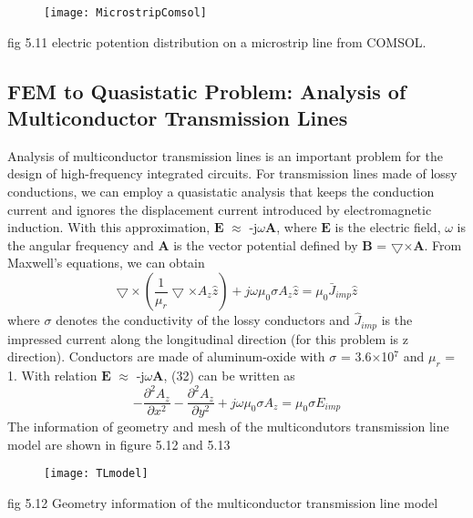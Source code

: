 \documentclass[journal]{IEEEtran}
\begin{document}
\begin{figure}[h]
	\centering
	\texttt{[image: MicrostripComsol]}
\end{figure}
\begin{center}
	\small fig 5.11 electric potention distribution on a microstrip line from COMSOL.
\end{center} 

\subsection{FEM to Quasistatic Problem: Analysis of Multiconductor Transmission Lines}
Analysis of multiconductor transmission lines is an important problem for the design of high-frequency integrated circuits. For transmission lines made of lossy conductions, we can employ a quasistatic analysis that keeps the conduction current and ignores the displacement current introduced by electromagnetic induction. With this approximation, ${\textbf{E}}$ $\approx$ -j$\omega$${\textbf{A}}$, where $\textbf{E}$ is the electric field,  $\omega$ is the angular frequency and $\textbf{A}$ is the vector potential defined by ${\textbf{B}}$ = $\bigtriangledown$$\times$${\textbf{A}}$. From Maxwell's equations, we can obtain
\begin{equation}
\bigtriangledown \times(\frac{1}{\mu_r}\bigtriangledown \times A_z \hat{z})+j \omega \mu_0 \sigma A_z \hat{z} = \mu_0 \bar{J}_{imp} \hat{z}
\end{equation}
where $\sigma$ denotes the conductivity of the lossy conductors and $\hat{J}$$_{imp}$ is the impressed current along the longitudinal direction (for this problem is z direction). Conductors are made of aluminum-oxide with $\sigma$ = 3.6$\times$10$^7$ and $\mu_r$ = 1. With relation  ${\textbf{E}}$ $\approx$ -j$\omega$${\textbf{A}}$, (32) can be written as
\begin{equation}
-\frac{\partial^2 {A_z}}{\partial {x^2}} - \frac{\partial^2 {A_z}}{\partial {y^2}} + j \omega \mu _0 \sigma A_z = \mu_0 \sigma E_{imp}
\end{equation}
The information of geometry and mesh of the multicondutors transmission line model are shown in figure 5.12 and 5.13
\begin{figure}[h]
	\centering
	\texttt{[image: TLmodel]}
\end{figure}
\begin{center}
	\small fig 5.12 Geometry information of the multiconductor transmission line model
\end{center} 
$$
\end{document}
